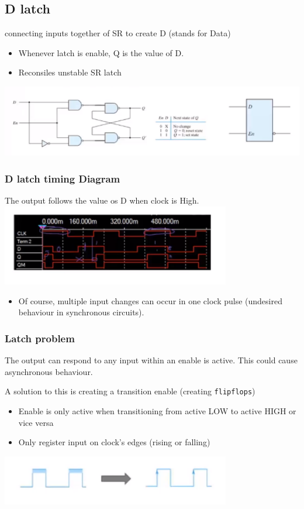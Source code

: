 \documentclass[a4paper,12pt]{article}
\begin{document}
    \subsection{D latch}
        connecting inputs together of SR to create D (stands for Data)
        \begin{itemize}
            \item Whenever latch is enable, Q is the value of D.
            \item Reconsiles unstable SR latch
        \end{itemize}
        \includegraphics[width=14cm]{DlatchDiagram.png}\\
            \subsubsection{D latch timing Diagram}
                The output follows the value os D when clock is High.\\
                \includegraphics[width=10cm]{Dlatchtiming.png}
                 \begin{itemize}
                    \item Of course, multiple input changes can occur in one clock pulse (undesired behaviour in synchronous circuits).
                 \end{itemize}
            \subsubsection{Latch problem}
                 The output can respond to any input within an enable is active. This could cause asynchronous behaviour.\\
                 \par A solution to this is creating a transition enable (creating \texttt{flipflops})
                 \begin{itemize}
                    \item Enable is only active when transitioning from active LOW to active HIGH or vice versa
                    \item Only register input on clock's edges (rising or falling)
                \end{itemize}
                \includegraphics[width=10cm]{LeveltoEdge.png}
                
\end{document}

